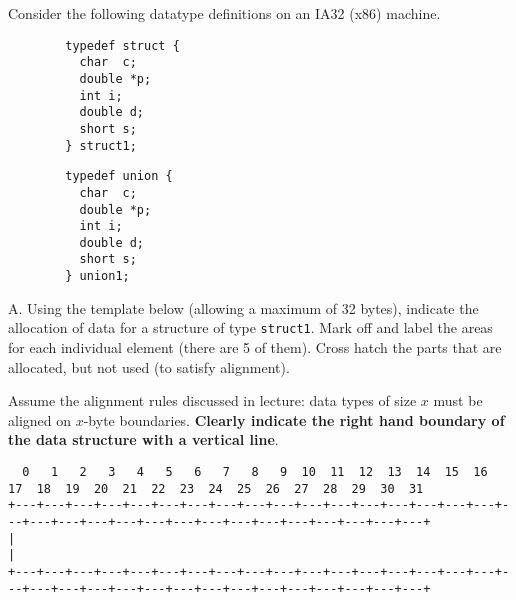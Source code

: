 \begin{problem}{6}
Consider the following datatype definitions on an IA32 (x86) machine.

\begin{minipage}[t]{3in}
\begin{verbatim}
        typedef struct {
          char  c;
          double *p;
          int i;
          double d;
          short s;
        } struct1;
\end{verbatim}
\end{minipage}
\begin{minipage}[t]{3in}
\begin{verbatim}
        typedef union {
          char  c;
          double *p;
          int i;
          double d;
          short s;
        } union1;
\end{verbatim}
\end{minipage}
\end{problem}

A. Using the template below (allowing a maximum of 32 bytes), indicate
the allocation of data for a structure of type {\tt struct1}.  Mark
off and label the areas for each individual element (there are 5 of
them).  Cross hatch the parts that are allocated, but not used (to
satisfy alignment).  

Assume the alignment rules discussed in lecture: data types
of size $x$ must be aligned on $x$-byte boundaries.  {\bf Clearly
indicate the right hand boundary of the data structure with a vertical
line}.


{\tiny
\begin{verbatim}
  0   1   2   3   4   5   6   7   8   9  10  11  12  13  14  15  16  17  18  19  20  21  22  23  24  25  26  27  28  29  30  31
+---+---+---+---+---+---+---+---+---+---+---+---+---+---+---+---+---+---+---+---+---+---+---+---+---+---+---+---+---+---+---+---+
|                                                                                                                               |
+---+---+---+---+---+---+---+---+---+---+---+---+---+---+---+---+---+---+---+---+---+---+---+---+---+---+---+---+---+---+---+---+
\end{verbatim}
}


